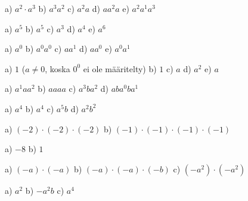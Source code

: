     \begin{tehtava}
        a) $a^2\cdot a^3$ \qquad
        b) $a^3a^2$ \qquad
        c) $a^2 a$ \qquad
        d) $a a^2 a$ \qquad
        e) $a^2a^1a^3$
        
        \begin{vastaus}
            a) $a^5$ \qquad
            b) $a^5$ \qquad
            c) $a^3$ \qquad
            d) $a^4$ \qquad
            e) $a^6$
        \end{vastaus}
    \end{tehtava}
    
    \begin{tehtava}
        a) $a^0$ \qquad
        b) $a^0a^0$ \qquad
        c) $a a^1$ \qquad
        d) $aa^0$ \qquad
        e) $a^0a^1$
        
        \begin{vastaus}
            a) $1$ \quad ($a\neq0$, koska $0^0$ ei ole määritelty) \qquad
            b) $1$ \qquad
            c) $a$ \qquad
            d) $a^2$ \qquad
            e) $a$
        \end{vastaus}
    \end{tehtava}
    
    \begin{tehtava}
        a) $a^1 a a^2$ \qquad
        b) $aaaa$ \qquad
        c) $a^3ba^2$ \qquad
        d) $aba^0ba^1$
        
        \begin{vastaus}
            a) $ a^4$ \qquad
            b) $a^4$ \qquad
            c) $a^5b$ \qquad
            d) $a^2b^2$
        \end{vastaus}
    \end{tehtava}
    
    \begin{tehtava}
        a) $(-2)\cdot(-2)\cdot(-2)$ \qquad
        b) $(-1)\cdot(-1)\cdot(-1)\cdot(-1)$
        
        \begin{vastaus}
            a) $ -8$ \qquad
            b) $1$
        \end{vastaus}
    \end{tehtava}
    
    \begin{tehtava}
        a) $(-a)\cdot(-a)$ \qquad
        b) $(-a)\cdot(-a)\cdot(-b)$ \qquad
        c) $(-a^2)\cdot(-a^2)$

        \begin{vastaus}
            a) $a^2$ \qquad
            b) $-a^2b$ \qquad
            c) $a^4$
        \end{vastaus}
    \end{tehtava}

